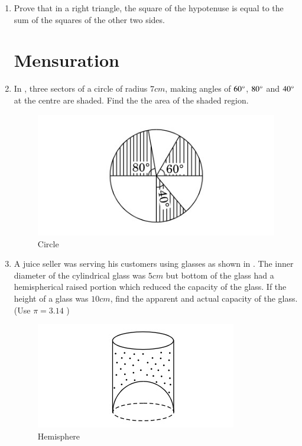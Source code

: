 \documentclass[2pt,-letter paper]{article}
\begin{document}
\begin{enumerate}
\item Prove that in a right triangle, the square of the hypotenuse is equal to the sum of the squares of the other two sides.

\section{Mensuration}

\item In , three sectors of a circle of radius $7cm$, making angles of $60\degree$,
$80\degree$ and $40\degree$ at the centre are shaded. Find the the area of the shaded region.
\begin{figure}[H]
    \centering
    \includegraphics[width=\columnwidth]{figures/Figure_2.png}
    \caption{Circle}
    \label{fig:fig-2}
\end{figure}

\item A juice seller was serving his customers using glasses as shown in  . The inner diameter of the cylindrical glass was $5 cm$ but bottom of the glass had a hemispherical raised portion which reduced the capacity of the glass. If the height of a glass was $10 cm$, find the apparent and actual capacity of the glass. (Use $\pi = 3.14$ )
\begin{figure}[H]
    \centering
    \includegraphics[width=\columnwidth]{figures/Figure_3.png}
    \caption{Hemisphere}
    \label{fig:Fig-3}
\end{figure}


\end{enumerate}
\end{document}
